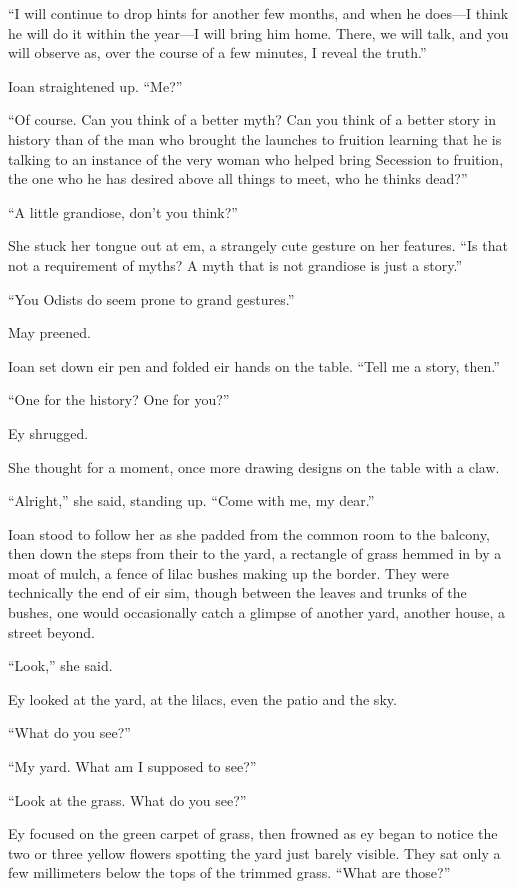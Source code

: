 ``I will continue to drop hints for another few months, and when he does---I think he will do it within the year---I will bring him home. There, we will talk, and you will observe as, over the course of a few minutes, I reveal the truth.''

Ioan straightened up. ``Me?''

``Of course. Can you think of a better myth? Can you think of a better story in history than of the man who brought the launches to fruition learning that he is talking to an instance of the very woman who helped bring Secession to fruition, the one who he has desired above all things to meet, who he thinks dead?''

``A little grandiose, don't you think?''

She stuck her tongue out at em, a strangely cute gesture on her features. ``Is that not a requirement of myths? A myth that is not grandiose is just a story.''

``You Odists do seem prone to grand gestures.''

May preened.

Ioan set down eir pen and folded eir hands on the table. ``Tell me a story, then.''

``One for the history? One for you?''

Ey shrugged.

She thought for a moment, once more drawing designs on the table with a claw.

``Alright,'' she said, standing up. ``Come with me, my dear.''

Ioan stood to follow her as she padded from the common room to the balcony, then down the steps from their to the yard, a rectangle of grass hemmed in by a moat of mulch, a fence of lilac bushes making up the border. They were technically the end of eir sim, though between the leaves and trunks of the bushes, one would occasionally catch a glimpse of another yard, another house, a street beyond.

``Look,'' she said.

Ey looked at the yard, at the lilacs, even the patio and the sky.

``What do you see?''

``My yard. What am I supposed to see?''

``Look at the grass. What do you see?''

Ey focused on the green carpet of grass, then frowned as ey began to notice the two or three yellow flowers spotting the yard just barely visible. They sat only a few millimeters below the tops of the trimmed grass. ``What are those?''

